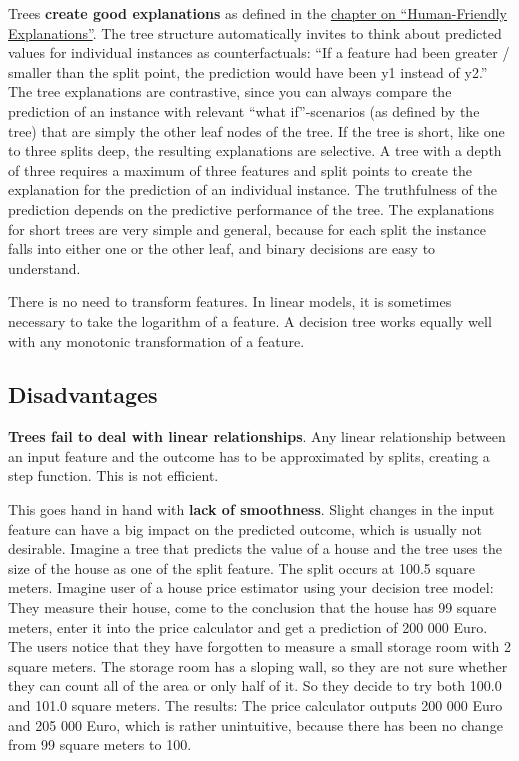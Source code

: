 \documentclass[
  12pt,
]{krantz}
\begin{document}
Trees \textbf{create good explanations} as defined in the \protect\hyperlink{good-explanation}{chapter on ``Human-Friendly Explanations''}.
The tree structure automatically invites to think about predicted values for individual instances as counterfactuals:
``If a feature had been greater / smaller than the split point, the prediction would have been y1 instead of y2.''
The tree explanations are contrastive, since you can always compare the prediction of an instance with relevant ``what if''-scenarios (as defined by the tree) that are simply the other leaf nodes of the tree.
If the tree is short, like one to three splits deep, the resulting explanations are selective.
A tree with a depth of three requires a maximum of three features and split points to create the explanation for the prediction of an individual instance.
The truthfulness of the prediction depends on the predictive performance of the tree.
The explanations for short trees are very simple and general, because for each split the instance falls into either one or the other leaf, and binary decisions are easy to understand.

There is no need to transform features.
In linear models, it is sometimes necessary to take the logarithm of a feature.
A decision tree works equally well with any monotonic transformation of a feature.

\hypertarget{disadvantages-2}{%
\subsection{Disadvantages}\label{disadvantages-2}}

\textbf{Trees fail to deal with linear relationships}.
Any linear relationship between an input feature and the outcome has to be approximated by splits, creating a step function.
This is not efficient.

This goes hand in hand with \textbf{lack of smoothness}.
Slight changes in the input feature can have a big impact on the predicted outcome, which is usually not desirable.
Imagine a tree that predicts the value of a house and the tree uses the size of the house as one of the split feature.
The split occurs at 100.5 square meters.
Imagine user of a house price estimator using your decision tree model:
They measure their house, come to the conclusion that the house has 99 square meters, enter it into the price calculator and get a prediction of 200 000 Euro.
The users notice that they have forgotten to measure a small storage room with 2 square meters.
The storage room has a sloping wall, so they are not sure whether they can count all of the area or only half of it.
So they decide to try both 100.0 and 101.0 square meters.
The results: The price calculator outputs 200 000 Euro and 205 000 Euro, which is rather unintuitive, because there has been no change from 99 square meters to 100.
\end{document}
